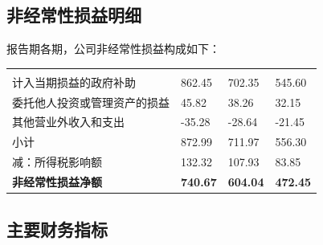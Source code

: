 \subsection{非经常性损益明细}

报告期各期，公司非经常性损益构成如下：

\begin{gstab}
\begin{longtable}{|L{49mm}|R{29mm}|R{29mm}|R{29mm}|}
\hline
{} &  &  &  \\ \hline
\endfirsthead
\hline
{} &  &  &  \\ \hline
\endhead
计入当期损益的政府补助 & 862.45 & 702.35 & 545.60 \\ \hline
委托他人投资或管理资产的损益 & 45.82 & 38.26 & 32.15 \\ \hline
其他营业外收入和支出 & -35.28 & -28.64 & -21.45 \\ \hline
小计 & 872.99 & 711.97 & 556.30 \\ \hline
减：所得税影响额 & 132.32 & 107.93 & 83.85 \\ \hline
{\bfseries 非经常性损益净额} & {\bfseries 740.67} & {\bfseries 604.04} & {\bfseries 472.45} \\ \hline
\end{longtable}
\end{gstab}

\subsection{主要财务指标}

